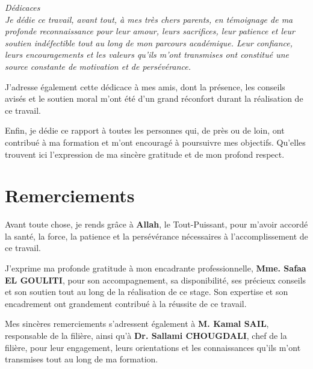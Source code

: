 \documentclass[12pt, a4paper, oneside]{report}
\begin{document}

\onehalfspacing
\newpage
\thispagestyle{empty}
\vspace*{5cm}
\begin{center}
\itshape\Large
\textcolor{primary}{Dédicaces}\\
\vspace{1.5cm}
Je dédie ce travail, avant tout, à mes très chers parents, en témoignage de ma profonde 
reconnaissance pour leur amour, leurs sacrifices, leur patience et leur soutien indéfectible 
tout au long de mon parcours académique. Leur confiance, leurs encouragements et les valeurs qu'ils m'ont 
transmises ont constitué une source constante de motivation et de persévérance.

J'adresse également cette dédicace à mes amis, dont la présence, les conseils avisés et le soutien 
moral m'ont été d'un grand réconfort durant la réalisation de ce travail.

Enfin, je dédie ce rapport à toutes les personnes qui, de près ou de loin, ont contribué à ma 
formation et m'ont encouragé à poursuivre mes objectifs. Qu'elles trouvent ici l'expression de 
ma sincère gratitude et de mon profond respect.

\end{center}

\newpage
\chapter*{Remerciements}
Avant toute chose, je rends grâce à \textbf{Allah}, le Tout-Puissant, pour m'avoir accordé la santé, 
la force, la patience et la persévérance nécessaires à l'accomplissement de ce travail.

J'exprime ma profonde gratitude à mon encadrante professionnelle, \textbf{Mme. Safaa EL GOULITI}, 
pour son accompagnement, sa disponibilité, ses précieux conseils et son soutien tout au long 
de la réalisation de ce stage. Son expertise et son encadrement ont grandement contribué à la 
réussite de ce travail.

Mes sincères remerciements s'adressent également à \textbf{M. Kamal SAIL}, responsable de la filière, 
ainsi qu'à \textbf{Dr. Sallami CHOUGDALI}, chef de la filière, pour leur engagement, leurs orientations et 
les connaissances qu'ils m'ont transmises tout au long de ma formation.
\end{document}
